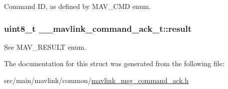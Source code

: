 Command I\+D, as defined by M\+A\+V\+\_\+\+C\+M\+D enum. 

\hypertarget{struct____mavlink__command__ack__t_ae8165e8e4f7a1438977e1a7edd646b69}{
\subsubsection[{result}]{\setlength{\rightskip}{0pt plus 5cm}uint8\+\_\+t \+\_\+\+\_\+mavlink\+\_\+command\+\_\+ack\+\_\+t\+::result}}\label{struct____mavlink__command__ack__t_ae8165e8e4f7a1438977e1a7edd646b69}


See M\+A\+V\+\_\+\+R\+E\+S\+U\+L\+T enum. 



The documentation for this struct was generated from the following file\+:\begin{DoxyCompactItemize}
\item 
src/main/mavlink/common/\hyperlink{mavlink__msg__command__ack_8h}{mavlink\+\_\+msg\+\_\+command\+\_\+ack.\+h}\end{DoxyCompactItemize}
